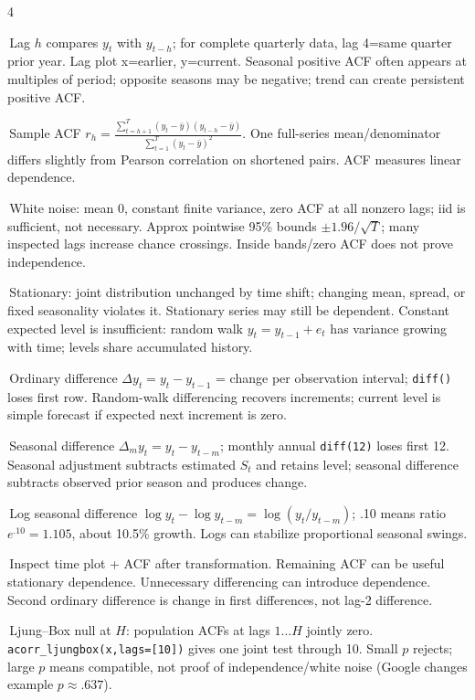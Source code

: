 \documentclass[10pt]{article}
\newcommand{\topic}[1]{\vspace{1.2pt}{\color{blue}\bfseries\fontsize{5.8}{6.0}\selectfont #1}\par\vspace{0.2pt}}
\newcommand{\code}[1]{\texttt{#1}}
\newcommand{\bitem}{\par\hangindent=0.08in\hangafter=1\textbullet\,}
\begin{document}
\begin{multicols*}{4}
\topic{LAGS + ACF}
\bitem Lag $h$ compares $y_t$ with $y_{t-h}$; for complete quarterly data, lag 4=same quarter prior year. Lag plot x=earlier, y=current. Seasonal positive ACF often appears at multiples of period; opposite seasons may be negative; trend can create persistent positive ACF.
\bitem Sample ACF $r_h=\frac{\sum_{t=h+1}^{T}(y_t-\bar y)(y_{t-h}-\bar y)}{\sum_{t=1}^{T}(y_t-\bar y)^2}$. One full-series mean/denominator differs slightly from Pearson correlation on shortened pairs. ACF measures linear dependence.
\bitem White noise: mean 0, constant finite variance, zero ACF at all nonzero lags; iid is sufficient, not necessary. Approx pointwise 95\% bounds $\pm1.96/\sqrt T$; many inspected lags increase chance crossings. Inside bands/zero ACF does not prove independence.

\columnbreak
\topic{STATIONARITY + DIFFERENCING}
\bitem Stationary: joint distribution unchanged by time shift; changing mean, spread, or fixed seasonality violates it. Stationary series may still be dependent. Constant expected level is insufficient: random walk $y_t=y_{t-1}+e_t$ has variance growing with time; levels share accumulated history.
\bitem Ordinary difference $\Delta y_t=y_t-y_{t-1}$ = change per observation interval; \code{diff()} loses first row. Random-walk differencing recovers increments; current level is simple forecast if expected next increment is zero.
\bitem Seasonal difference $\Delta_m y_t=y_t-y_{t-m}$; monthly annual \code{diff(12)} loses first 12. Seasonal adjustment subtracts estimated $S_t$ and retains level; seasonal difference subtracts observed prior season and produces change.
\bitem Log seasonal difference $\log y_t-\log y_{t-m}=\log(y_t/y_{t-m})$; .10 means ratio $e^{.10}=1.105$, about 10.5\% growth. Logs can stabilize proportional seasonal swings.
\bitem Inspect time plot + ACF after transformation. Remaining ACF can be useful stationary dependence. Unnecessary differencing can introduce dependence. Second ordinary difference is change in first differences, not lag-2 difference.
\bitem Ljung--Box null at $H$: population ACFs at lags $1\ldots H$ jointly zero. \code{acorr\_ljungbox(x,lags=[10])} gives one joint test through 10. Small $p$ rejects; large $p$ means compatible, not proof of independence/white noise (Google changes example $p\approx.637$).


\end{multicols*}
\end{document}
